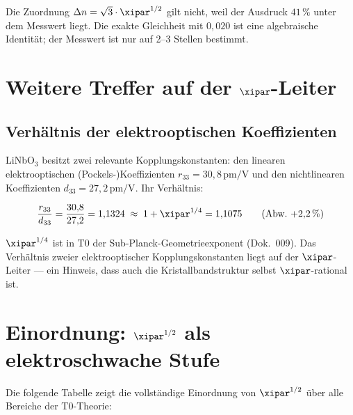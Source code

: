 \medskip
Die Zuordnung $\Delta n = \sqrt{3}\cdot\xipar^{1/2}$ gilt nicht, weil der Ausdruck
$41\,\%$ unter dem Messwert liegt. Die exakte Gleichheit mit $0{,}020$ ist eine
algebraische Identität; der Messwert ist nur auf 2--3 Stellen bestimmt.

\clearpage

\section{Weitere Treffer auf der \texorpdfstring{$\xipar$}{xi}-Leiter}
\label{sec:weitere}

\subsection{Verhältnis der elektrooptischen Koeffizienten}

LiNbO$_3$ besitzt zwei relevante Kopplungskonstanten: den linearen
elektrooptischen (Pockels-)Koeffizienten $r_{33} = 30{,}8\,\text{pm/V}$
und den nichtlinearen Koeffizienten $d_{33} = 27{,}2\,\text{pm/V}$.
Ihr Verhältnis:

\begin{equation}
    \frac{r_{33}}{d_{33}} = \frac{30{,}8}{27{,}2} = 1{,}1324
    \;\approx\; 1 + \xipar^{1/4} = 1{,}1075
    \qquad (\text{Abw.}\ {+}2{,}2\,\%)
\end{equation}

$\xipar^{1/4}$ ist in T0 der Sub-Planck-Geometrieexponent (Dok.~009).
Das Verhältnis zweier elektrooptischer Kopplungskonstanten liegt auf der
$\xipar$-Leiter — ein Hinweis, dass auch die Kristallbandstruktur selbst
$\xipar$-rational ist.

\clearpage

\section{Einordnung: \texorpdfstring{$\xipar^{1/2}$}{xi\^{}(1/2)} als
  elektroschwache Stufe}
\label{sec:einordnung}

Die folgende Tabelle zeigt die vollständige Einordnung von $\xipar^{1/2}$
über alle Bereiche der T0-Theorie:

